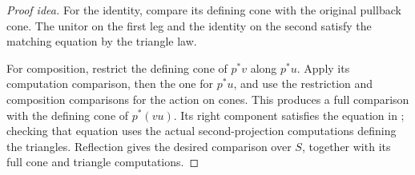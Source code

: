 \documentclass[11pt]{article}
\begin{document}
\begin{proof}[Proof idea]
For the identity, compare its defining cone with the original pullback
cone. The unitor on the first leg and the identity on the second satisfy
the matching equation by the triangle law.

For composition, restrict the defining cone of $p^*v$ along $p^*u$.
Apply its computation comparison, then the one for $p^*u$, and use the
restriction and composition comparisons for the action on cones. This
produces a full comparison with the defining cone of $p^*(vu)$.
Its right component satisfies the equation in
; checking that equation
uses the actual second-projection computations defining the triangles.
Reflection gives the desired comparison over $S$, together with its full
cone and triangle computations.
\end{proof}
\end{document}
